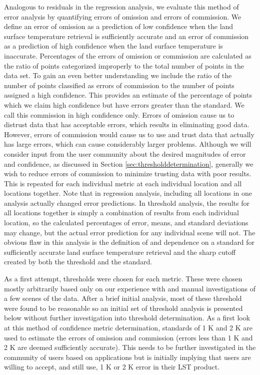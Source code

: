 \documentclass{book}
\begin{document}
Analogous to residuals in the regression analysis, we evaluate this method of error analysis by quantifying errors of omission and errors of commission.  We define an error of omission as a prediction of low confidence when the land surface temperature retrieval is sufficiently accurate and an error of commission as a prediction of high confidence when the land surface temperature is inaccurate.  Percentages of the errors of omission or commission are calculated as the ratio of points categorized improperly to the total number of points in the data set.  To gain an even better understanding we include the ratio of the number of points classified as errors of commission to the number of points assigned a high confidence.  This provides an estimate of the percentage of points which we claim high confidence but have errors greater than the standard.  We call this commission in high confidence only.  Errors of omission cause us to distrust data that has acceptable errors, which results in eliminating good data.  However, errors of commission would cause us to use and trust data that actually has large errors, which can cause considerably larger problems.  Although we will consider input from the user community about the desired magnitudes of error and confidence, as discussed in Section \ref{sec:thresholddetermination}, generally we wish to reduce errors of commission to minimize trusting data with poor results.  This is repeated for each individual metric at each individual location and all locations together.  Note that in regression analysis, including all locations in one analysis actually changed error predictions.  In threshold analysis, the results for all locations together is simply a combination of results from each individual location, so the calculated percentages of error, means, and standard deviations may change, but the actual error prediction for any individual scene will not.  The obvious flaw in this analysis is the definition of and dependence on a standard for sufficiently accurate land surface temperature retrieval and the sharp cutoff created by both the threshold and the standard.

As a first attempt, thresholds were chosen for each metric.  These were chosen mostly arbitrarily based only on our experience with and manual investigations of a few scenes of the data.  After a brief initial analysis, most of these threshold were found to be reasonable so an initial set of threshold analysis is presented below without further investigation into threshold determination.  As a first look at this method of confidence metric determination, standards of 1 K and 2 K are used to estimate the errors of omission and commission (errors less than 1 K and 2 K are deemed sufficiently accurate).  This needs to be further investigated in the community of users based on applications but is initially implying that users are willing to accept, and still use, 1 K or 2 K error in their LST product.
\end{document}
